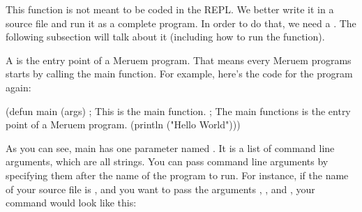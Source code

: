This function is not meant to be coded in the REPL. We better write it in a source file and run it as a complete program. In order to do that, we need a . The following subsection will talk about it (including how to run the  function).

A  is the entry point of a Meruem program. That means every Meruem programs starts by calling the main function. For example, here's the code for the  program again:

\begin{REPL}
(defun main (args)    ; This is the main function.
  ; The main functions is the entry point of a Meruem program.
  (println ("Hello World")))
\end{REPL}

As you can see, main has one parameter named . It is a list of command line arguments, which are all strings. You can pass command line arguments by specifying them after the name of the program to run. For instance, if the name of your source file is , and you want to pass the arguments , , and , your command would look like this: 

